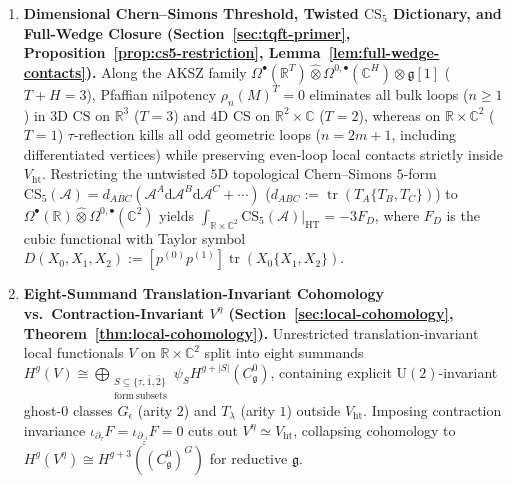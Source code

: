 \documentclass[11pt,letterpaper]{article}
\numberwithin{equation}{section}
\theoremstyle{plain}
\theoremstyle{definition}
\theoremstyle{remark}
\newcommand{\dd}{\mathrm{d}}
\newcommand{\fg}{\mathfrak{g}}
\newcommand{\tr}{\operatorname{tr}}
\newcommand{\Vht}{V_{\mathrm{ht}}}
\newcommand{\Veta}{V^\eta}
\newcommand{\Cg}{C^0_{\fg}}
\begin{document}
\begin{enumerate}[label=\textbf{Result~\arabic*.},leftmargin=*]
  \item \textbf{Dimensional Chern--Simons Threshold, Twisted $\mathrm{CS}_5$ Dictionary, and Full-Wedge Closure (Section~\ref{sec:tqft-primer}, Proposition~\ref{prop:cs5-restriction}, Lemma~\ref{lem:full-wedge-contacts}).} Along the AKSZ family $\Omega^\bullet(\mathbb{R}^T)\widehat{\otimes}\Omega^{0,\bullet}(\mathbb{C}^H)\otimes\fg[1]$ ($T+H=3$), Pfaffian nilpotency $\rho_n(M)^T = 0$ eliminates all bulk loops ($n \ge 1$) in $3\mathrm{D}$ CS on $\mathbb{R}^3$ ($T=3$) and $4\mathrm{D}$ CS on $\mathbb{R}^2\times\mathbb{C}$ ($T=2$), whereas on $\mathbb{R}\times\mathbb{C}^2$ ($T=1$) $\tau$-reflection kills all odd geometric loops ($n = 2m+1$, including differentiated vertices) while preserving even-loop local contacts strictly inside $\Vht$. Restricting the untwisted $5\mathrm{D}$ topological Chern--Simons $5$-form $\mathrm{CS}_5(\mathcal{A}) = d_{ABC}(\mathcal{A}^A\dd\mathcal{A}^B\dd\mathcal{A}^C + \cdots)$ ($d_{ABC} := \tr(T_A\{T_B,T_C\})$) to $\Omega^\bullet(\mathbb{R})\widehat{\otimes}\Omega^{0,\bullet}(\mathbb{C}^2)$ yields $\int_{\mathbb{R}\times\mathbb{C}^2}\mathrm{CS}_5(\mathcal{A})|_{\mathrm{HT}} = -3 F_D$, where $F_D$ is the cubic functional with Taylor symbol $D(X_0,X_1,X_2) := [p^{(0)}p^{(1)}]\tr(X_0\{X_1,X_2\})$.

  \item \textbf{Eight-Summand Translation-Invariant Cohomology vs.\ Contraction-Invariant $\Veta$ (Section~\ref{sec:local-cohomology}, Theorem~\ref{thm:local-cohomology}).} Unrestricted translation-invariant local functionals $V$ on $\mathbb{R}\times\mathbb{C}^2$ split into eight summands $H^g(V) \cong \bigoplus_{\substack{S\subseteq\{\tau,\bar{1},\bar{2}\}\\\mathrm{form\ subsets}}}\psi_S H^{g+|S|}(\Cg)$, containing explicit $\mathrm{U}(2)$-invariant ghost-$0$ classes $G_\epsilon$ (arity $2$) and $T_\lambda$ (arity $1$) outside $\Vht$. Imposing contraction invariance $\iota_{\partial_\tau}F = \iota_{\partial_{\bar{z}^{\bar{\imath}}}}F = 0$ cuts out $\Veta \simeq \Vht$, collapsing cohomology to $H^g(\Veta) \cong H^{g+3}((\Cg)^G)$ for reductive $\fg$.


\end{enumerate}
\end{document}
